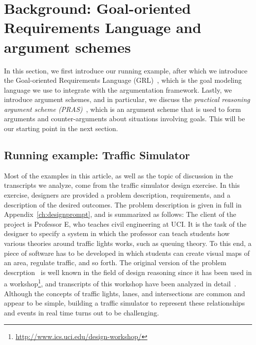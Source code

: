 \section{Background: Goal-oriented Requirements Language and argument schemes}
\label{sect:background}

In this section, we first introduce our running example, after which we introduce the Goal-oriented Requirements Language (GRL)~\cite{Amyot:2010:EGM:1841349.1841356}, which is the goal modeling language we use to integrate with the argumentation framework. Lastly, we introduce argument schemes, and in particular, we discuss the \emph{practical reasoning argument scheme (PRAS)}~\cite{atkinson2007}, which is an argument scheme that is used to form arguments and counter-arguments about situations involving goals. This will be our starting point in the next section.

\subsection{Running example: Traffic Simulator}
\label{sect:goals:runningexample}

Most of the examples in this article, as well as the topic of discussion in the transcripts we analyze, come from the traffic simulator design exercise. In this exercise, designers are provided a problem description, requirements, and a description of the desired outcomes. The problem description is given in full in Appendix~\ref{ch:designprompt}, and is summarized as follows: The client of the project is Professor E, who teaches civil engineering at UCI. It is the task of the designer to specify a system in which the professor can teach students how various theories around traffic lights works, such as queuing theory. To this end, a piece of software has to be developed in which students can create visual maps of an area, regulate traffic, and so forth. The original version of the problem descrption~\cite{UCIworkshop} is well known in the field of design reasoning since it has been used in a workshop\footnote{\url{http://www.ics.uci.edu/design-workshop/}}, and transcripts of this workshop have been analyzed in detail~\cite{Petre:2013:SDA:2535028}. Although the concepts of traffic lights, lanes, and intersections are common and appear to be simple, building a traffic simulator to represent these relationships and events in real time turns out to be challenging.

